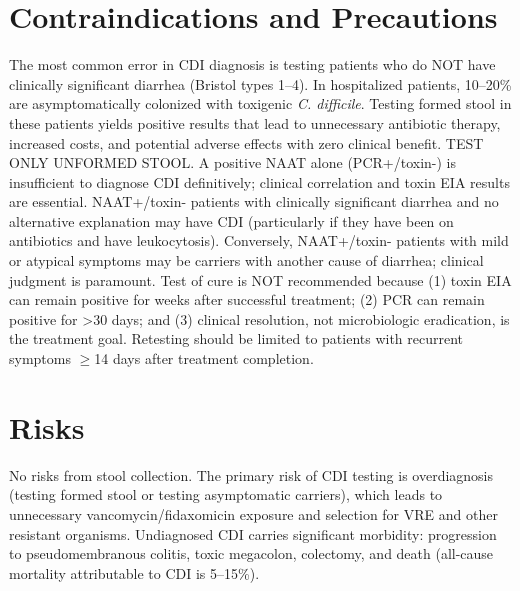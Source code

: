 \section*{Contraindications and Precautions}
The most common error in CDI diagnosis is testing patients who do NOT have clinically significant diarrhea (Bristol types 1--4). In hospitalized patients, 10--20\% are asymptomatically colonized with toxigenic \textit{C. difficile}. Testing formed stool in these patients yields positive results that lead to unnecessary antibiotic therapy, increased costs, and potential adverse effects with zero clinical benefit. TEST ONLY UNFORMED STOOL. A positive NAAT alone (PCR+/toxin-) is insufficient to diagnose CDI definitively; clinical correlation and toxin EIA results are essential. NAAT+/toxin- patients with clinically significant diarrhea and no alternative explanation may have CDI (particularly if they have been on antibiotics and have leukocytosis). Conversely, NAAT+/toxin- patients with mild or atypical symptoms may be carriers with another cause of diarrhea; clinical judgment is paramount. Test of cure is NOT recommended because (1) toxin EIA can remain positive for weeks after successful treatment; (2) PCR can remain positive for >30 days; and (3) clinical resolution, not microbiologic eradication, is the treatment goal. Retesting should be limited to patients with recurrent symptoms $\geq$14 days after treatment completion.

\section*{Risks}
No risks from stool collection. The primary risk of CDI testing is overdiagnosis (testing formed stool or testing asymptomatic carriers), which leads to unnecessary vancomycin/fidaxomicin exposure and selection for VRE and other resistant organisms. Undiagnosed CDI carries significant morbidity: progression to pseudomembranous colitis, toxic megacolon, colectomy, and death (all-cause mortality attributable to CDI is 5--15\%).


